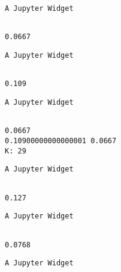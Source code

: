 \documentclass[11pt]{article}
\begin{document}
    
    \begin{verbatim}
A Jupyter Widget
    \end{verbatim}

    
    \begin{Verbatim}[commandchars=\\\{\}]

0.0667

    \end{Verbatim}

    
    \begin{verbatim}
A Jupyter Widget
    \end{verbatim}

    
    \begin{Verbatim}[commandchars=\\\{\}]

0.109

    \end{Verbatim}

    
    \begin{verbatim}
A Jupyter Widget
    \end{verbatim}

    
    \begin{Verbatim}[commandchars=\\\{\}]

0.0667
0.10900000000000001 0.0667
K: 29

    \end{Verbatim}

    
    \begin{verbatim}
A Jupyter Widget
    \end{verbatim}

    
    \begin{Verbatim}[commandchars=\\\{\}]

0.127

    \end{Verbatim}

    
    \begin{verbatim}
A Jupyter Widget
    \end{verbatim}

    
    \begin{Verbatim}[commandchars=\\\{\}]

0.0768

    \end{Verbatim}

    
    \begin{verbatim}
A Jupyter Widget
    \end{verbatim}
\end{document}
